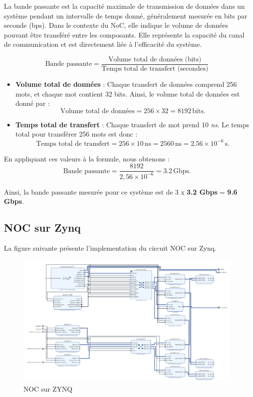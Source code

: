 \documentclass[../CSC_5RO07_TA.tex]{subfiles}
\begin{document}
La bande passante est la capacité maximale de transmission de données dans un système pendant un intervalle de temps donné, généralement mesurée en bits par seconde (bps). Dans le contexte du NoC, elle indique le volume de données pouvant être transféré entre les composants. Elle représente la capacité du canal de communication et est directement liée à l’efficacité du système.

\[
\text{Bande passante} = \frac{\text{Volume total de données (bits)}}{\text{Temps total de transfert (secondes)}}
\]


\begin{itemize}
    \item \textbf{Volume total de données} : Chaque transfert de données comprend 256 mots, et chaque mot contient 32 bits. Ainsi, le volume total de données est donné par :
    \[
    \text{Volume total de données} = 256 \times 32 = 8192 \, \text{bits}.
    \]

    \item \textbf{Temps total de transfert} : Chaque transfert de mot prend 10 \textit{ns}. Le temps total pour transférer 256 mots est donc :
    \[
    \text{Temps total de transfert} = 256 \times 10 \, \text{ns} = 2560 \, \text{ns} = 2.56 \times 10^{-6} \, \text{s}.
    \]
\end{itemize}

En appliquant ces valeurs à la formule, nous obtenons :
\[
\text{Bande passante} = \frac{8192}{2,56 \times 10^{-6}} = 3.2 \, \text{Gbps}.
\]

Ainsi, la bande passante mesurée pour ce système est de 3 x \textbf{3.2 Gbps} = \textbf{9.6 Gbps}.


 
\subsection{NOC sur Zynq}

La figure suivante présente l'implementation du circuit NOC sur Zynq. 

\begin{figure}[H]
    \centering
    \includegraphics[width=1\textwidth]{./images/NOCZYNQ.png}
    \caption{NOC sur ZYNQ}
\end{figure}
\end{document}
